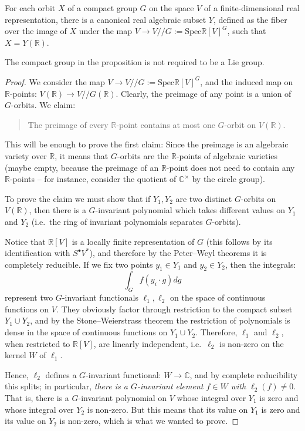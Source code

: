 \begin{proposition}
\label{proposition-compact-orbit-algebraic}
For each orbit $X$ of a compact group $G$ on the space $V$ of a finite-dimensional real representation, there is a canonical real algebraic subset $Y$, defined as the fiber over the image of $X$ under the map $V\to V// G:=\text{Spec} \mathbb R[V]^G$, such that $X=Y(\mathbb R)$.
\end{proposition}

The compact group in the proposition is not required to be a Lie group. 

\begin{proof}
 We consider the map $V\to V// G:=\text{Spec} \mathbb R[V]^G$, and the induced map on $\mathbb R$-points: $V(\mathbb R)\to V// G(\mathbb R)$. Clearly, the preimage of any point is a union of $G$-orbits. We claim:

\begin{quote}
 The preimage of every $\mathbb R$-point contains at most one $G$-orbit on $V(\mathbb R)$.
\end{quote}

This will be enough to prove the first claim: Since the preimage is an algebraic variety over $\mathbb R$, it means that $G$-orbits are the $\mathbb R$-points of algebraic varieties (maybe empty, because the preimage of an $\mathbb R$-point does not need to contain any $\mathbb R$-points -- for instance, consider the quotient of $\mathbb C^\times$ by the circle group).

To prove the claim we must show that if $Y_1,Y_2$ are two distinct $G$-orbits on $V(\mathbb R)$, then there is a $G$-invariant polynomial which takes different values on $Y_1$ and $Y_2$ (i.e.\ the ring of invariant polynomials separates $G$-orbits). 

Notice that $\mathbb R[V]$ is a locally finite representation of $G$ (this follows by its identification with $S^\bullet V^*$), and therefore by the Peter--Weyl theorems it is completely reducible. If we fix two points $y_1\in Y_1$ and $y_2\in Y_2$, then the integrals:
$$\int_G f(y_i\cdot g) dg$$
represent two $G$-invariant functionals $\ell_1,\ell_2$ on the space of continuous functions on $V$. They obviously factor through restriction to the compact subset $Y_1\cup Y_2$, and by the Stone--Weierstrass theorem the restriction of polynomials is dense in the space of continuous functions on $Y_1\cup Y_2$. Therefore, $\ell_1$ and $\ell_2$, when restricted to $\mathbb R[V]$, are linearly independent, i.e.\ $\ell_2$ is non-zero on the kernel $W$ of $\ell_1$. 

Hence, $\ell_2$ defines a $G$-invariant functional: $W\to \mathbb C$, and by complete reducibility this splits; in particular, \emph{there is a $G$-invariant element $f\in W$ with $\ell_2(f)\ne 0$}. That is, there is a $G$-invariant polynomial on $V$ whose integral over $Y_1$ is zero and whose integral over $Y_2$ is non-zero. But this means that its value on $Y_1$ is zero and its value on $Y_2$ is non-zero, which is what we wanted to prove.
\end{proof}


